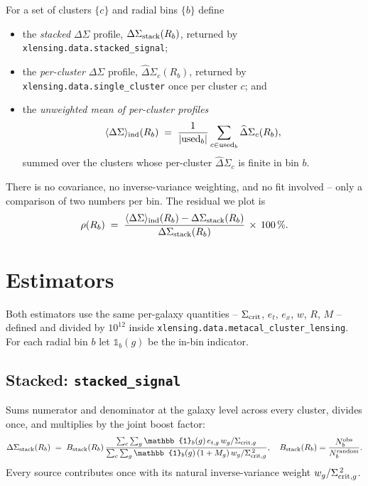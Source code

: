 \documentclass[11pt,a4paper]{article}
\newcommand{\DS}{\Delta\Sigma}
\newcommand{\sigcrit}{\Sigma_{\rm crit}}
\begin{document}
For a set of clusters $\{c\}$ and radial bins $\{b\}$ define
\begin{itemize}
\item the \emph{stacked} $\DS$ profile,
      $\DS_{\rm stack}(R_b)$, returned by
      \verb|xlensing.data.stacked_signal|;
\item the \emph{per-cluster} $\DS$ profile,
      $\widehat\DS_{c}(R_b)$, returned by
      \verb|xlensing.data.single_cluster| once per cluster $c$; and
\item the \emph{unweighted mean of per-cluster profiles}
      \begin{equation}
      \langle\DS\rangle_{\rm ind}(R_b)
       \;=\;
       \frac{1}{|\mathrm{used}_b|}
       \sum_{c \in \mathrm{used}_b}
        \widehat\DS_{c}(R_b),
       \label{eq:avg}
       \end{equation}
       summed over the clusters whose per-cluster $\widehat\DS_{c}$ is
       finite in bin $b$.
\end{itemize}
There is no covariance, no inverse-variance weighting, and no fit
involved -- only a comparison of two numbers per bin.  The residual we
plot is
\begin{equation}
\rho(R_b) \;=\;
\frac{\langle\DS\rangle_{\rm ind}(R_b) - \DS_{\rm stack}(R_b)}
     {\DS_{\rm stack}(R_b)} \,\times\, 100\,\%.
\label{eq:residual}
\end{equation}


\section{Estimators}
\label{sec:estimators}

Both estimators use the same per-galaxy quantities -- $\sigcrit$,
$e_t$, $e_x$, $w$, $R$, $M$ -- defined and divided by $10^{12}$ inside
\verb|xlensing.data.metacal_cluster_lensing|.  For each radial bin $b$
let $\mathbb{1}_b(g)$ be the in-bin indicator.

\subsection{Stacked: \texttt{stacked\_signal}}

Sums numerator and denominator at the galaxy level across every
cluster, divides once, and multiplies by the joint boost factor:
\begin{equation}
\DS_{\rm stack}(R_b)
\;=\;
B_{\rm stack}(R_b)\,
\frac{
   \sum_c \sum_g \mathbb{1}_b(g)\, e_{t,g}\, w_g / \Sigma_{{\rm crit},g}
}{
   \sum_c \sum_g \mathbb{1}_b(g)\, (1 + M_g)\, w_g / \Sigma_{{\rm crit},g}^{\,2}
},
\quad
B_{\rm stack}(R_b) = \frac{N_b^{\rm obs}}{N_b^{\rm random}}.
\label{eq:stacked}
\end{equation}
Every source contributes once with its natural inverse-variance weight
$w_g / \Sigma_{{\rm crit},g}^{\,2}$.
\end{document}
